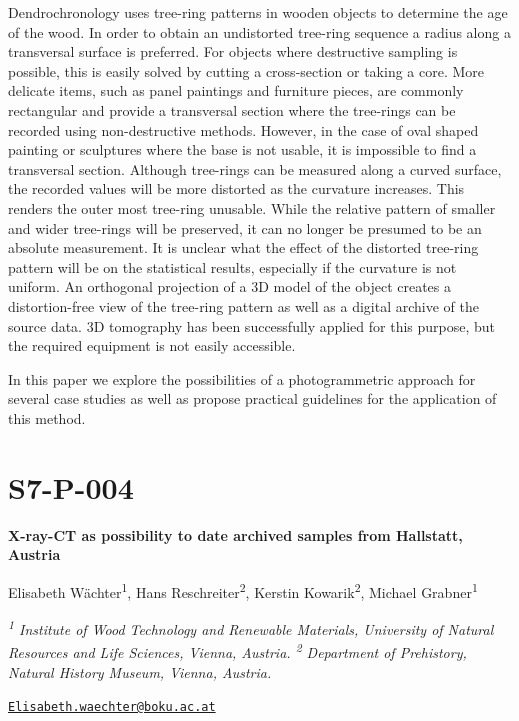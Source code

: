 \documentclass[
]{book}
\begin{document}
Dendrochronology uses tree-ring patterns in wooden objects to determine the age of the wood. In order to obtain an undistorted tree-ring sequence a radius along a transversal surface is preferred. For objects where destructive sampling is possible, this is easily solved by cutting a cross-section or taking a core. More delicate items, such as panel paintings and furniture pieces, are commonly rectangular and provide a transversal section where the tree-rings can be recorded using non-destructive methods. However, in the case of oval shaped painting or sculptures where the base is not usable, it is impossible to find a transversal section. Although tree-rings can be measured along a curved surface, the recorded values will be more distorted as the curvature increases. This renders the outer most tree-ring unusable. While the relative pattern of smaller and wider tree-rings will be preserved, it can no longer be presumed to be an absolute measurement. It is unclear what the effect of the distorted tree-ring pattern will be on the statistical results, especially if the curvature is not uniform. An orthogonal projection of a 3D model of the object creates a distortion-free view of the tree-ring pattern as well as a digital archive of the source data. 3D tomography has been successfully applied for this purpose, but the required equipment is not easily accessible.

In this paper we explore the possibilities of a photogrammetric approach for several case studies as well as propose practical guidelines for the application of this method.

\hypertarget{s7-p-004}{%
\section*{S7-P-004}\label{s7-p-004}}

\textbf{X-ray-CT as possibility to date archived samples from Hallstatt, Austria}

Elisabeth Wächter\textsuperscript{1}, Hans Reschreiter\textsuperscript{2}, Kerstin Kowarik\textsuperscript{2}, Michael Grabner\textsuperscript{1}

\emph{\textsuperscript{1} Institute of Wood Technology and Renewable Materials, University of Natural Resources and Life Sciences, Vienna, Austria. \textsuperscript{2} Department of Prehistory, Natural History Museum, Vienna, Austria.}

\href{mailto:Elisabeth.waechter@boku.ac.at}{\nolinkurl{Elisabeth.waechter@boku.ac.at}}
\end{document}
